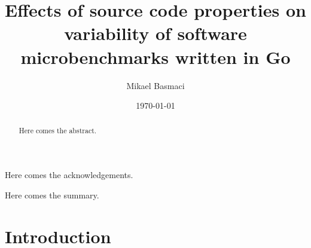 \documentclass{seal_thesis}
\date{\today}
\title{Effects of source code properties on variability of software microbenchmarks written in Go}
\author{Mikael Basmaci}
\begin{document}
\maketitle

\frontmatter

\begin{acknowledgements}
	Here comes the acknowledgements.
\end{acknowledgements}

\begin{abstract}
	Here comes the abstract.
\end{abstract}

\begin{zusammenfassung}
	Here comes the summary.
\end{zusammenfassung}

\tableofcontents
\listoffigures
\listoftables
\lstlistoflistings

\mainmatter

\chapter{Introduction}
\end{document}
